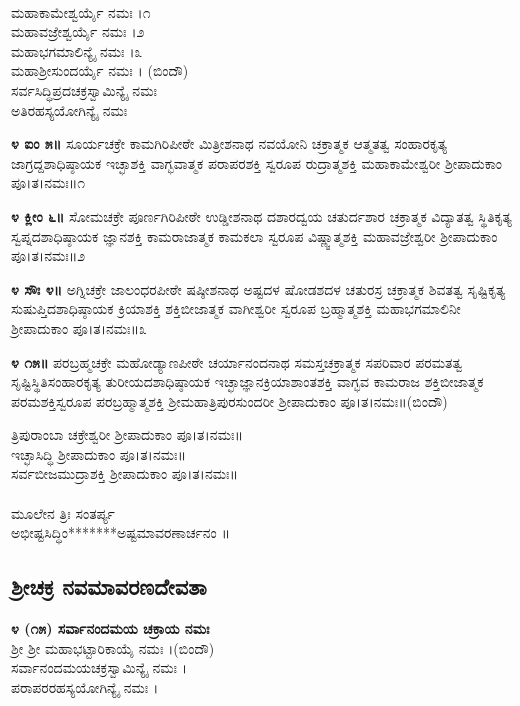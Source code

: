 \\
 ಮಹಾಕಾಮೇಶ್ವರ್ಯೈ ನಮಃ ।೧\\
 ಮಹಾವಜ್ರೇಶ್ವರ್ಯೈ ನಮಃ ।೨\\
 ಮಹಾಭಗಮಾಲಿನ್ಯೈ ನಮಃ ।೩\\
 ಮಹಾಶ್ರೀಸುಂದರ್ಯೈ ನಮಃ । (ಬಿಂದೌ)\\
 ಸರ್ವಸಿದ್ಧಿಪ್ರದಚಕ್ರಸ್ವಾಮಿನ್ಯೈ ನಮಃ\\
ಅತಿರಹಸ್ಯಯೋಗಿನ್ಯೈ ನಮಃ

{\bfseries ೪ ಐಂ ೫॥} ಸೂರ್ಯಚಕ್ರೇ ಕಾಮಗಿರಿಪೀಠೇ ಮಿತ್ರೀಶನಾಥ ನವಯೋನಿ ಚಕ್ರಾತ್ಮಕ ಆತ್ಮತತ್ವ ಸಂಹಾರಕೃತ್ಯ ಜಾಗ್ರದ್ದಶಾಧಿಷ್ಠಾಯಕ ಇಚ್ಛಾಶಕ್ತಿ ವಾಗ್ಭವಾತ್ಮಕ ಪರಾಪರಶಕ್ತಿ ಸ್ವರೂಪ ರುದ್ರಾತ್ಮಶಕ್ತಿ ಮಹಾಕಾಮೇಶ್ವರೀ ಶ್ರೀಪಾದುಕಾಂ ಪೂ।ತ।ನಮಃ॥೧

{\bfseries೪ ಕ್ಲೀಂ ೬॥} ಸೋಮಚಕ್ರೇ ಪೂರ್ಣಗಿರಿಪೀಠೇ ಉಡ್ಡೀಶನಾಥ  ದಶಾರದ್ವಯ ಚತುರ್ದಶಾರ ಚಕ್ರಾತ್ಮಕ ವಿದ್ಯಾತತ್ವ ಸ್ಥಿತಿಕೃತ್ಯ ಸ್ವಪ್ನದಶಾಧಿಷ್ಠಾಯಕ ಜ್ಞಾನಶಕ್ತಿ ಕಾಮರಾಜಾತ್ಮಕ ಕಾಮಕಲಾ ಸ್ವರೂಪ ವಿಷ್ಣ್ವಾತ್ಮಶಕ್ತಿ ಮಹಾವಜ್ರೇಶ್ವರೀ ಶ್ರೀಪಾದುಕಾಂ ಪೂ।ತ।ನಮಃ॥೨

{\bfseries೪ ಸೌಃ ೪॥} ಅಗ್ನಿಚಕ್ರೇ ಜಾಲಂಧರಪೀಠೇ  ಷಷ್ಠೀಶನಾಥ ಅಷ್ಟದಳ ಷೋಡಶದಳ ಚತುರಸ್ರ ಚಕ್ರಾತ್ಮಕ ಶಿವತತ್ವ ಸೃಷ್ಟಿಕೃತ್ಯ ಸುಷುಪ್ತಿದಶಾಧಿಷ್ಠಾಯಕ ಕ್ರಿಯಾಶಕ್ತಿ ಶಕ್ತಿಬೀಜಾತ್ಮಕ ವಾಗೀಶ್ವರೀ ಸ್ವರೂಪ ಬ್ರಹ್ಮಾತ್ಮಶಕ್ತಿ  ಮಹಾಭಗಮಾಲಿನೀ ಶ್ರೀಪಾದುಕಾಂ ಪೂ।ತ।ನಮಃ॥೩

{\bfseries೪ ೧೫॥} ಪರಬ್ರಹ್ಮಚಕ್ರೇ ಮಹೋಡ್ಯಾಣಪೀಠೇ ಚರ್ಯಾನಂದನಾಥ ಸಮಸ್ತಚಕ್ರಾತ್ಮಕ ಸಪರಿವಾರ ಪರಮತತ್ವ ಸೃಷ್ಟಿಸ್ಥಿತಿಸಂಹಾರಕೃತ್ಯ ತುರೀಯದಶಾಧಿಷ್ಠಾಯಕ ಇಚ್ಛಾಜ್ಞಾನಕ್ರಿಯಾಶಾಂತಶಕ್ತಿ ವಾಗ್ಭವ ಕಾಮರಾಜ ಶಕ್ತಿಬೀಜಾತ್ಮಕ ಪರಮಶಕ್ತಿಸ್ವರೂಪ ಪರಬ್ರಹ್ಮಾತ್ಮಶಕ್ತಿ ಶ್ರೀಮಹಾತ್ರಿಪುರಸುಂದರೀ ಶ್ರೀಪಾದುಕಾಂ ಪೂ।ತ।ನಮಃ॥(ಬಿಂದೌ)

 ತ್ರಿಪುರಾಂಬಾ ಚಕ್ರೇಶ್ವರೀ ಶ್ರೀಪಾದುಕಾಂ ಪೂ।ತ।ನಮಃ॥\\
 ಇಚ್ಛಾಸಿದ್ಧಿ ಶ್ರೀಪಾದುಕಾಂ ಪೂ।ತ।ನಮಃ॥\\
 ಸರ್ವಬೀಜಮುದ್ರಾಶಕ್ತಿ ಶ್ರೀಪಾದುಕಾಂ ಪೂ।ತ।ನಮಃ॥\\
\\
ಮೂಲೇನ ತ್ರಿಃ ಸಂತರ್ಪ್ಯ\\
 ಅಭೀಷ್ಟಸಿದ್ಧಿಂ*******ಅಷ್ಟಮಾವರಣಾರ್ಚನಂ ॥
\subsection{ಶ್ರೀಚಕ್ರ ನವಮಾವರಣದೇವತಾ}
{\bfseries ೪ (೧೫) ಸರ್ವಾನಂದಮಯ ಚಕ್ರಾಯ ನಮಃ}\\
 ಶ್ರೀ ಶ್ರೀ ಮಹಾಭಟ್ಟಾರಿಕಾಯೈ ನಮಃ ।(ಬಿಂದೌ)\\
 ಸರ್ವಾನಂದಮಯಚಕ್ರಸ್ವಾಮಿನ್ಯೈ ನಮಃ ।\\
ಪರಾಪರರಹಸ್ಯಯೋಗಿನ್ಯೈ ನಮಃ ।

